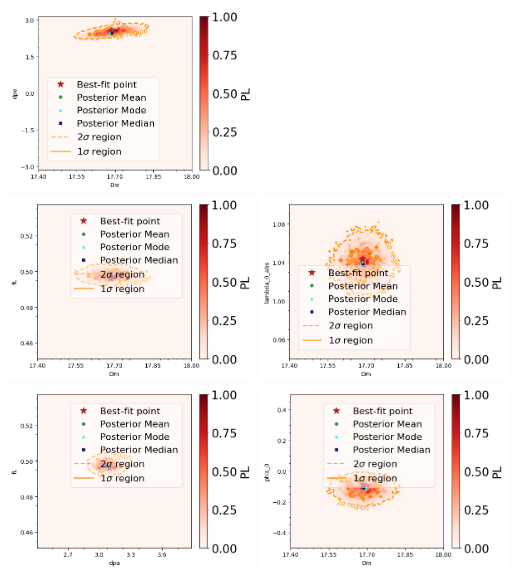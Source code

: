\begin{center}
\includegraphics[width=0.49\textwidth]{figs/Dm_vs_dpe.png}\\
\includegraphics[width=0.49\textwidth]{figs/Dm_vs_fL.png}
\includegraphics[width=0.49\textwidth]{figs/Dm_vs_lambda_0_abs.png}\\
\includegraphics[width=0.49\textwidth]{figs/dpa_vs_fL.png}
\includegraphics[width=0.49\textwidth]{figs/Dm_vs_phis_0.png}\\

\end{center}
